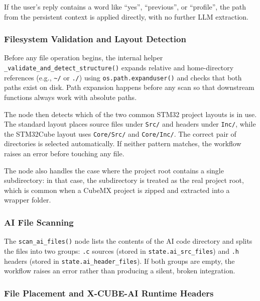 If the user's reply contains a word like ``yes'', ``previous'', or ``profile'', the path from the persistent context is applied directly, with no further LLM extraction.

\subsubsection{Filesystem Validation and Layout Detection}

Before any file operation begins, the internal helper \texttt{\_\allowbreak validate\_\allowbreak and\_\allowbreak detect\_\allowbreak structure()} expands relative and home-directory references (e.g., \texttt{\textasciitilde/} or \texttt{./}) using \texttt{os.path.expanduser()} and checks that both paths exist on disk. Path expansion happens before any scan so that downstream functions always work with absolute paths.

The node then detects which of the two common STM32 project layouts is in use. The standard layout places source files under \texttt{Src/} and headers under \texttt{Inc/}, while the STM32Cube layout uses \texttt{Core/Src/} and \texttt{Core/Inc/}. The correct pair of directories is selected automatically. If neither pattern matches, the workflow raises an error before touching any file.

The node also handles the case where the project root contains a single subdirectory: in that case, the subdirectory is treated as the real project root, which is common when a CubeMX project is zipped and extracted into a wrapper folder.

\subsubsection{AI File Scanning}

The \texttt{scan\_\allowbreak ai\_\allowbreak files()} node lists the contents of the AI code directory and splits the files into two groups: \texttt{.c} sources (stored in \texttt{state.ai\_\allowbreak src\_\allowbreak files}) and \texttt{.h} headers (stored in \texttt{state.ai\_\allowbreak header\_\allowbreak files}). If both groups are empty, the workflow raises an error rather than producing a silent, broken integration.

\subsubsection{File Placement and X-CUBE-AI Runtime Headers}
\label{sec:copy_ai_files}

